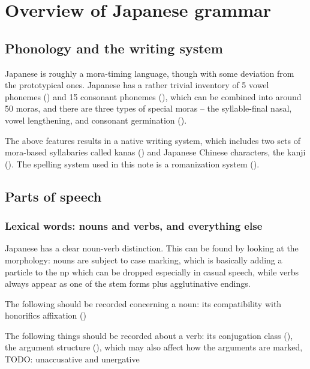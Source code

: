 \documentclass[UTF8, a4paper, oneside, scheme=plain]{ctexrep}
\begin{document}
\chapter{Overview of Japanese grammar}


\section{Phonology and the writing system}

Japanese is roughly a mora-timing language,
though with some deviation from the prototypical ones.
Japanese has a rather trivial inventory of 5 vowel phonemes () 
and 15 consonant phonemes (),
which can be combined into around 50 moras,
and there are three types of special moras -- 
the syllable-final nasal, vowel lengthening, and consonant germination 
().

The above features results in a native writing system,
which includes two sets of mora-based syllabaries called kanas ()
and Japanese Chinese characters, the kanji ().
The spelling system used in this note is a romanization system ().

\section{Parts of speech}

\subsection{Lexical words: nouns and verbs, and everything else}\label{sec:lexical-word-overview}

Japanese has a clear noun-verb distinction.
This can be found by looking at the morphology:
nouns are subject to case marking,
which is basically adding a particle to the \acs{np} 
which can be dropped especially in casual speech,
while verbs always appear as one of the stem forms plus agglutinative endings.

The following should be recorded concerning a noun:
its compatibility with honorifics affixation ()

The following things should be recorded about a verb:
its conjugation class (),
the argument structure (),
which may also affect how the arguments are marked,
TODO: unaccusative and unergative
\end{document}
